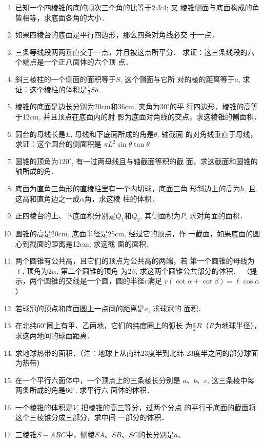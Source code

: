\begin{enumerate}
\item 已知一个四棱锥的底的顺次三个角的比等于2:3:4; 又
棱锥侧面与底面构成的角皆相等，求底面各角的大小．
\item 如果四棱台的底面是平行四边形，那么四条对角线必交
于一点．
\item 三条等线段两两垂直交于一点，并且被这点所平分．
求证：这三条线段的六个端点是一个正八面体的六个顶
点．
\item 斜三棱柱的一个侧面的面积等于$S$, 这个侧面与它所
对的棱的距离等于$a$, 求证：这个棱柱的体积是$\frac{1}{2}Sa$.
\item 棱锥的底面是边长分别为20cm和36cm, 夹角为$30^{\circ}$的平
行四边形，棱锥的高等于12cm, 并且顶点在底面内的射
影为底面对角线的交点，求这棱锥的侧面积．
\item 圆台的母线长是$L$, 母线和下底面所成的角是$\theta$, 轴截面
的对角线垂直于母线，求证：这个圆台的侧面积是
$\pi L^2\sin\theta \tan\theta$
\item 圆锥的顶角为$120^{\circ}$, 有一过两母线且与轴截面等积的截
面，求这截面和圆锥的轴所成的角．
\item 底面为直角三角形的直棱柱里有一个内切球，底面三角
形斜边上的高为$h$, 且这高和直角边之一成$\alpha$角，求这棱
柱的体积．
\item 正四棱台的上、下底面积分别是$Q_1$和$Q_2$, 其侧面积为$P$, 
求对角面的面积．
\item 圆锥的高是20cm, 底面半径是25cm, 经过它的顶点，作
一截面，如果底面的圆心到截面的距离是12cm, 求这截
面的面积．
\item 两个圆锥有公共高，且它们的顶点为公共高的两端，若
第一个圆锥的母线为$\ell$, 顶角为$2\alpha$, 第二个圆锥的顶角
为$2\beta$, 求这两个圆锥公共部分的体积．
（提示，两个圆锥的交线是一个圆，圆的半径$r$满足
$r(\cot\alpha+\cot\beta)=\ell\cos\alpha$）
\item 若球冠的顶点和底面圆上一点间的距离是$a$, 求球冠的
面积．
\item 在北纬$60^{\circ}$圈上有甲、乙两地，它们的纬度圈上的弧长
为$\frac{\pi}{2}R$（$R$为地球半径），求这两地间的球面距离．
\item 求地球热带的面积．（注：地球上从南纬23度半到北纬
23度半之间的部分球面为热带）
\item 在一个平行六面体中，一个顶点上的三条棱长分别是
$a$、$b$、$c$, 这三条棱中每两条所成的角是$60^{\circ}$. 求平行六
面体的体积．
\item 一个棱锥的体积是$V$, 把棱锥的高三等分，过两个分点
的平行于底面的截面将这个三棱锥分成三部分，求中间
一部分的体积．
\item 三棱锥$S-ABC$中，侧棱$SA$、$SB$、$SC$的长分别是$a$、

\end{enumerate}
